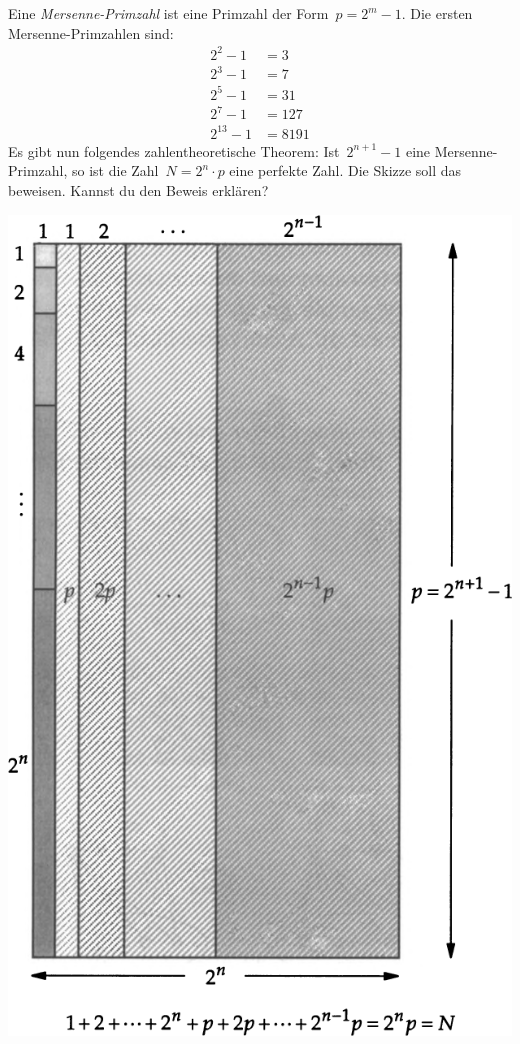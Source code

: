 \documentclass{../../zirkelblatt}
\begin{document}
Eine \emph{Mersenne-Primzahl} ist eine Primzahl der Form~$p = 2^m-1$. Die ersten
Mersenne-Primzahlen sind:
\begin{align*}
  2^2 - 1 &= 3 \\
  2^3 - 1 &= 7 \\
  2^5 - 1 &= 31 \\
  2^7 - 1 &= 127 \\
  2^{13} - 1 &= 8191
\end{align*}
Es gibt nun folgendes zahlentheoretische Theorem: Ist~$2^{n+1}-1$ eine
Mersenne-Primzahl, so ist die Zahl~$N = 2^n \cdot p$ eine perfekte Zahl. Die
Skizze soll das beweisen. Kannst du den Beweis erklären?
\begin{center}
\includegraphics[scale=0.5]{mersenne-perfekt}
\end{center}
\end{document}
